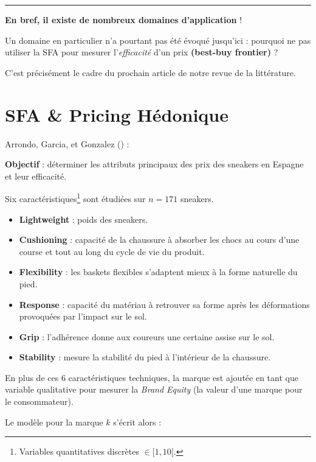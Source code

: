 \documentclass[
  12pt,
]{report}
\begin{document}
\begin{center}\rule{0.5\linewidth}{0.5pt}\end{center}

\textbf{En bref, il existe de nombreux domaines d'application} !

Un domaine en particulier n'a pourtant pas été évoqué jusqu'ici :
pourquoi ne pas utiliser la SFA pour mesurer l'\emph{efficacité} d'un
prix \textbf{(best-buy frontier)} ?

C'est précisément le cadre du prochain article de notre revue de la
littérature.

\section{SFA \& Pricing Hédonique}\label{sfa-pricing-huxe9donique}

Arrondo, Garcia, et Gonzalez () :

\textbf{Objectif} : déterminer les attributs principaux des prix des
sneakers en Espagne et leur efficacité.

Six caractéristiques\footnote{Variables quantitatives discrètes
  \(\in [1,10[\).} sont étudiées sur \(n=171\) sneakers.

\begin{itemize}
\item
  \textbf{Lightweight} : poids des sneakers.
\item
  \textbf{Cushioning} : capacité de la chaussure à absorber les chocs au
  cours d'une course et tout au long du cycle de vie du produit.
\item
  \textbf{Flexibility} : les baskets flexibles s'adaptent mieux à la
  forme naturelle du pied.
\item
  \textbf{Response} : capacité du matériau à retrouver sa forme après
  les déformations provoquées par l'impact sur le sol.
\item
  \textbf{Grip} : l'adhérence donne aux coureurs une certaine assise sur
  le sol.
\item
  \textbf{Stability} : mesure la stabilité du pied à l'intérieur de la
  chaussure.
\end{itemize}

En plus de ces 6 caractéristiques techniques, la marque est ajoutée en
tant que variable qualitative pour mesurer la \emph{Brand Equity} (la
valeur d'une marque pour le consommateur).

\newpage

Le modèle pour la marque \(k\) s'écrit alors :
\end{document}
